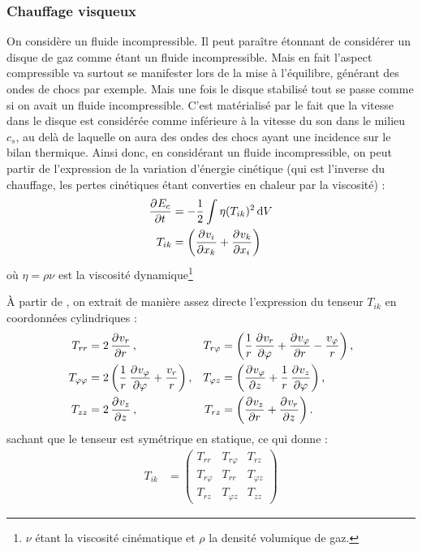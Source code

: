 \subsubsection{Chauffage visqueux}
On considère un fluide incompressible. Il peut paraître étonnant de considérer un disque de gaz comme étant un fluide incompressible. Mais en fait l'aspect compressible va surtout se manifester lors de la mise à l'équilibre, générant des ondes de chocs par exemple. Mais une fois le disque stabilisé tout se passe comme si on avait un fluide incompressible. C'est matérialisé par le fait que la vitesse dans le disque est considérée comme inférieure à la vitesse du son dans le milieu $c_s$, au delà de laquelle on aura des ondes des chocs ayant une incidence sur le bilan thermique. Ainsi donc, en considérant un fluide incompressible, on peut partir de l'expression de la variation d'énergie cinétique (qui est l'inverse du chauffage, les pertes cinétiques étant converties en chaleur par la viscosité) \citep[(16.3)]{landau1989mecanique} : 
\begin{align}
\dpd{E_c}{t} &= - \frac{1}{2}\int \eta(T_{ik})^2\dif V\\
T_{ik} &= \left(\dpd{v_i}{x_k} + \dpd{v_k}{x_i}\right)\nonumber
\end{align}
où $\eta = \rho\nu$ est la viscosité dynamique\footnote{$\nu$ étant la viscosité cinématique et $\rho$ la densité volumique de gaz.}

À partir de \citep[(15.8) et (15.17)]{landau1989mecanique}, on extrait de manière assez directe l'expression du tenseur $T_{ik}$ en coordonnées cylindriques : 
\begin{align}
T_{rr} &= 2\dpd{v_r}{r}, & T_{r\varphi} &= \left(\inv{r} \dpd{v_r}{\varphi} + \dpd{v_\varphi}{r} - \frac{v_\varphi}{r}\right),\nonumber\\
T_{\varphi\varphi} &= 2 \left(\inv{r} \dpd{v_\varphi}{\varphi} + \frac{v_r}{r}\right), & T_{\varphi z} &= \left(\dpd{v_\varphi}{z} + \inv{r}\dpd{v_z}{\varphi}\right),\\
T_{zz} &= 2\dpd{v_z}{z}, & T_{rz} &= \left(\dpd{v_z}{r} + \dpd{v_r}{z}\right).\nonumber
\end{align}
sachant que le tenseur est symétrique en statique, ce qui donne : 
\begin{align}
T_{ik} &= \begin{pmatrix}
T_{rr} & T_{r\varphi} & T_{rz}\\
T_{r\varphi} & T_{rr} & T_{\varphi z}\\
T_{rz} & T_{\varphi z} & T_{zz}
\end{pmatrix}
\end{align}

